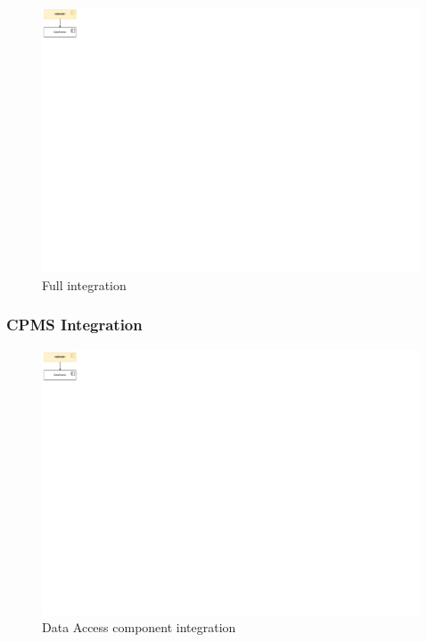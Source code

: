\documentclass[11pt]{article}
\begin{document}
\begin{figure}[!ht]
    \centering
    \includegraphics[page={5}, trim=0cm 22.5cm 26.5cm 0cmm, width=\linewidth, clip]{IntegrationDiagram.pdf}
    \caption{Full integration}
\end{figure}

\subsubsection{CPMS Integration}

\begin{figure}[!ht]
    \centering
    \includegraphics[page={6}, trim=0cm 31cm 46cm 0cmm, clip]{IntegrationDiagram.pdf}
    \caption{Data Access component integration}
\end{figure}
\end{document}
